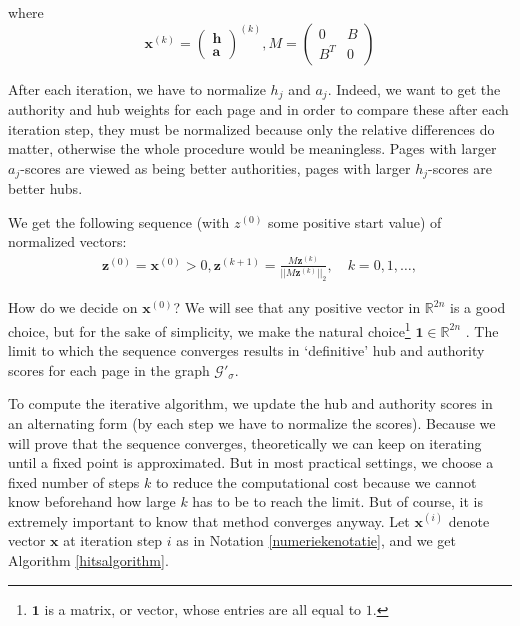 \documentclass[a4paper,11pt]{report}
\newcommand{\R}{{\mathbb R}}
\newcommand{\graf}{\mathscr{G}}
\begin{document}
where 
$$\mathbf{x}^{(k)} = \begin{pmatrix} 
\mathbf{h}\\
\mathbf{a}
\end{pmatrix}^{(k)}, M =  \begin{pmatrix} 
0 & B\\
B^T & 0
\end{pmatrix}$$

After each iteration, we have to normalize $h_j$ and $a_j$. Indeed, we want to get the authority and hub weights for each page
and in order to compare these after each iteration step, they must be normalized because only the relative differences do matter, otherwise the whole procedure would be 
meaningless. Pages with larger $a_j$-scores are viewed as being better authorities, pages with larger $h_j$-scores are better hubs. 

We get the following sequence (with $z^{(0)}$ some positive start value) of normalized vectors: 
\begin{eqnarray}\label{sequencezk}
  \mathbf{z}^{(0)} = \mathbf{x}^{(0)} > 0, \mathbf{z}^{(k+1)} = \frac{M\mathbf{z}^{(k)}}{||M\mathbf{z}^{(k)}||_2}, \quad k = 
  0,1,\ldots,
\end{eqnarray}

How do we decide on $\mathbf{x}^{(0)}$? We will see that any positive vector in $\R^{2n}$ is a good choice, but for the sake of simplicity, we make the natural choice\footnote{$\mathbf{1}$ is a matrix, or vector, whose entries are all equal to 
$1$.} $\mathbf{1} \in \R^{2n}$ . The limit to which the sequence converges 
results in `definitive' hub and authority scores for each page in the graph $\graf'_\sigma$. 

To compute the iterative algorithm, we update the hub and authority scores in an alternating form (by each step we have to normalize the scores). 
Because we will prove that the sequence converges, theoretically we can keep on iterating until a fixed point is approximated. But in most practical settings, 
we choose a fixed number of steps $k$ to reduce the computational cost because we cannot know beforehand how
large $k$ has to be to reach the limit. But of course, it is extremely important to know that method converges anyway. Let $\mathbf{x}^{(i)}$ denote vector $\mathbf{x}$ at iteration step $i$ as in Notation \ref{numeriekenotatie}, and we get Algorithm 
\ref{hitsalgorithm}.
\end{document}
